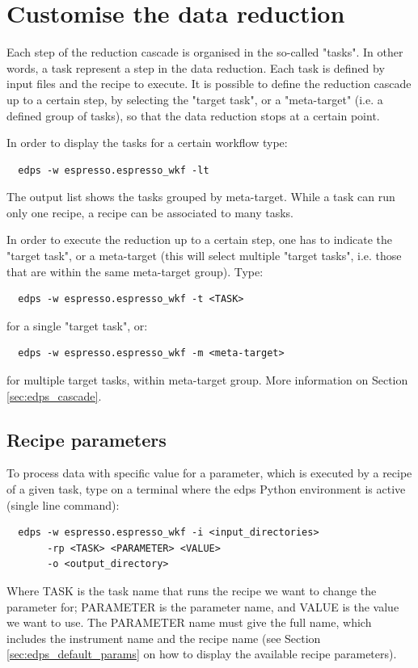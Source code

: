 
\section{Customise the data reduction}
\label{sec:edps_parameters}
Each step of the reduction cascade is organised in the so-called "tasks". In other words, a task represent a step in the data reduction. Each task is defined by input files and the recipe to execute. It is possible to define the reduction cascade up to a certain step, by selecting the "target task", or a "meta-target" (i.e. a defined group of tasks), so that the data reduction stops at a certain point.

In order to display the tasks for a certain workflow type:
\begin{verbatim}
  edps -w espresso.espresso_wkf -lt
 \end{verbatim}  
The output list shows the tasks grouped by meta-target.
While a task can run only one recipe, a recipe can be associated to many tasks.

In order to execute the reduction up to a certain step, one has to indicate the "target task", or a meta-target (this will select multiple "target tasks", i.e. those that are within the same meta-target group). Type:
\begin{verbatim}
  edps -w espresso.espresso_wkf -t <TASK>
 \end{verbatim}  
for a single "target task", or:
 \begin{verbatim}
  edps -w espresso.espresso_wkf -m <meta-target>
 \end{verbatim}  
for multiple target tasks, within meta-target group.
 More information on Section \ref{sec:edps_cascade}.


\subsection{Recipe parameters}
\label{sec:edps_recipe_parameters}

To process data with specific value for a parameter, which is executed by a recipe of a given task, type on a terminal where the edps Python environment is active (single line command):
\begin{verbatim}
  edps -w espresso.espresso_wkf -i <input_directories> 
       -rp <TASK> <PARAMETER> <VALUE> 
       -o <output_directory>
 \end{verbatim}  
 
Where TASK is the task name that runs the recipe we want to change the parameter for; PARAMETER is the parameter name, and VALUE is the value we want to use. The PARAMETER name must give the full name, which includes the instrument name and the recipe name (see Section \ref{sec:edps_default_params} on how to display the available recipe parameters). 

